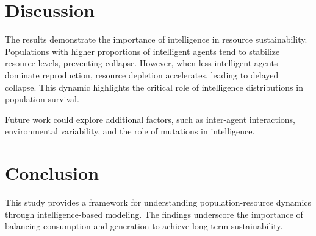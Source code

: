 \documentclass[12pt]{article}
\begin{document}
\section{Discussion}
The results demonstrate the importance of intelligence in resource sustainability. Populations with higher proportions of intelligent agents tend to stabilize resource levels, preventing collapse. However, when less intelligent agents dominate reproduction, resource depletion accelerates, leading to delayed collapse. This dynamic highlights the critical role of intelligence distributions in population survival.

Future work could explore additional factors, such as inter-agent interactions, environmental variability, and the role of mutations in intelligence.

\section{Conclusion}
This study provides a framework for understanding population-resource dynamics through intelligence-based modeling. The findings underscore the importance of balancing consumption and generation to achieve long-term sustainability.
\end{document}
